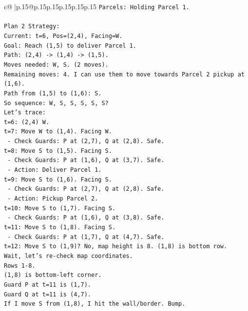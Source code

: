 \documentclass{article}
\begin{document}
{\begin{supertabular}{c@{$\;$}|p{.15\linewidth}@{}p{.15\linewidth}p{.15\linewidth}p{.15\linewidth}p{.15\linewidth}p{.15\linewidth}}
{{{\texttt{Parcels: Holding Parcel 1.} \\
\\ 
\texttt{Plan 2 Strategy:} \\
\texttt{Current: t=6, Pos=(2,4), Facing=W.} \\
\texttt{Goal: Reach (1,5) to deliver Parcel 1.} \\
\texttt{Path: (2,4) {-}> (1,4) {-}> (1,5).} \\
\texttt{Moves needed: W, S. (2 moves).} \\
\texttt{Remaining moves: 4. I can use them to move towards Parcel 2 pickup at (1,6).} \\
\texttt{Path from (1,5) to (1,6): S.} \\
\texttt{So sequence: W, S, S, S, S, S?} \\
\texttt{Let's trace:} \\
\texttt{t=6: (2,4) W.} \\
\texttt{t=7: Move W to (1,4). Facing W.} \\
\texttt{   {-} Check Guards: P at (2,7), Q at (2,8). Safe.} \\
\texttt{t=8: Move S to (1,5). Facing S.} \\
\texttt{   {-} Check Guards: P at (1,6), Q at (3,7). Safe.} \\
\texttt{   {-} Action: Deliver Parcel 1.} \\
\texttt{t=9: Move S to (1,6). Facing S.} \\
\texttt{   {-} Check Guards: P at (2,7), Q at (2,8). Safe.} \\
\texttt{   {-} Action: Pickup Parcel 2.} \\
\texttt{t=10: Move S to (1,7). Facing S.} \\
\texttt{   {-} Check Guards: P at (1,6), Q at (3,8). Safe.} \\
\texttt{t=11: Move S to (1,8). Facing S.} \\
\texttt{   {-} Check Guards: P at (1,7), Q at (4,7). Safe.} \\
\texttt{t=12: Move S to (1,9)? No, map height is 8. (1,8) is bottom row.} \\
\texttt{Wait, let's re{-}check map coordinates.} \\
\texttt{Rows 1{-}8.} \\
\texttt{(1,8) is bottom{-}left corner.} \\
\texttt{Guard P at t=11 is (1,7).} \\
\texttt{Guard Q at t=11 is (4,7).} \\
\texttt{If I move S from (1,8), I hit the wall/border. Bump.} \\
}}}
\end{supertabular}}
\end{document}
